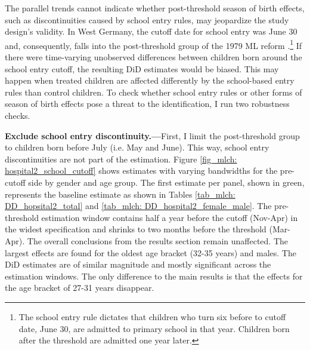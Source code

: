 The parallel trends cannot indicate whether post-threshold season of birth effects, such as discontinuities caused by school entry rules, may jeopardize the study design's validity. In West Germany, the cutoff date for school entry was June 30 and, consequently, falls into the post-threshold group of the 1979 ML reform \citep{juerges2011}.\footnote{The school entry rule dictates that children who turn six before to cutoff date, June 30, are admitted to primary school in that year. Children born after the threshold are admitted one year later.} If there were time-varying unobserved differences between children born around the school entry cutoff, the resulting DiD estimates would be biased. This may happen when treated children are affected differently by the school-based entry rules than control children. To check whether school entry rules or other forms of season of birth effects pose a threat to the identification, I run two robustness checks.

\textbf{Exclude school entry discontinuity.---}First, I limit the post-threshold group to children born before July (i.e. May and June). This way, school entry discontinuities are not part of the estimation. Figure \ref{fig_mlch: hospital2_school_cutoff} shows estimates with varying bandwidths for the pre-cutoff side by gender and age group. The first estimate per panel, shown in green, represents the baseline estimate as shown in Tables \ref{tab_mlch: DD_hopsital2_total} and \ref{tab_mlch: DD_hospital2_female_male}. The pre-threshold estimation window contains half a year before the cutoff (Nov-Apr) in the widest specification and shrinks to two months before the threshold (Mar-Apr). The overall conclusions from the results section remain unaffected. The largest effects are found for the oldest age bracket (32-35 years) and males. The DiD estimates are of similar magnitude and mostly significant across the estimation windows. The only difference to the main results is that the effects for the age bracket of 27-31 years disappear.


